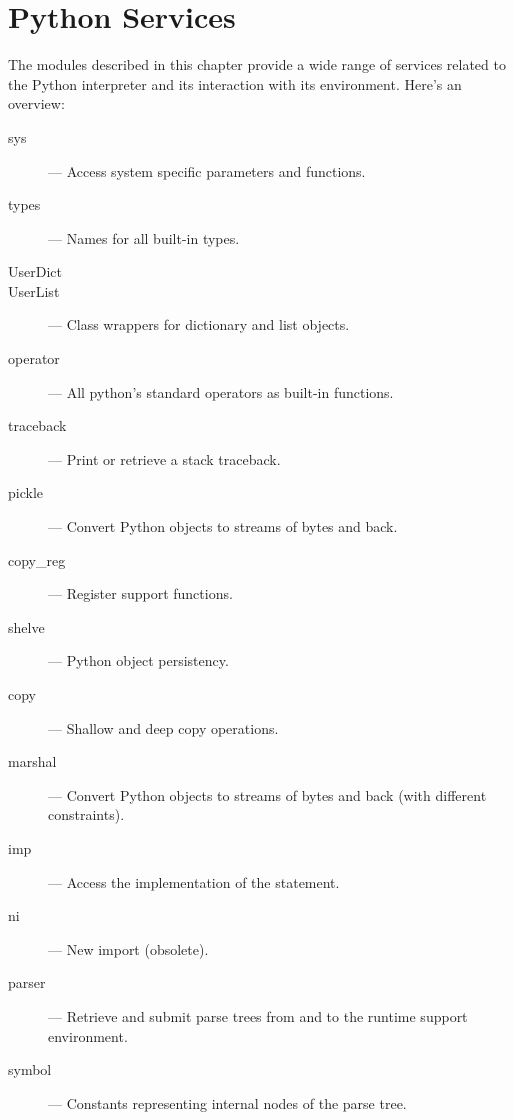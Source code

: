 \chapter{Python Services}

The modules described in this chapter provide a wide range of services
related to the Python interpreter and its interaction with its
environment.  Here's an overview:

\begin{description}

\item[sys]
--- Access system specific parameters and functions.

\item[types]
--- Names for all built-in types.

\item[UserDict]
\item[UserList]
--- Class wrappers for dictionary and list objects.

\item[operator]
--- All python's standard operators as built-in functions.

\item[traceback]
--- Print or retrieve a stack traceback.

\item[pickle]
--- Convert Python objects to streams of bytes and back.

\item[copy_reg]
--- Register  support functions.

\item[shelve]
--- Python object persistency.

\item[copy]
--- Shallow and deep copy operations.

\item[marshal]
--- Convert Python objects to streams of bytes and back (with
different constraints).

\item[imp]
--- Access the implementation of the  statement.

\item[ni]
--- New import (obsolete).

\item[parser]
--- Retrieve and submit parse trees from and to the runtime support
environment.

\item[symbol]
--- Constants representing internal nodes of the parse tree.


\end{description}
